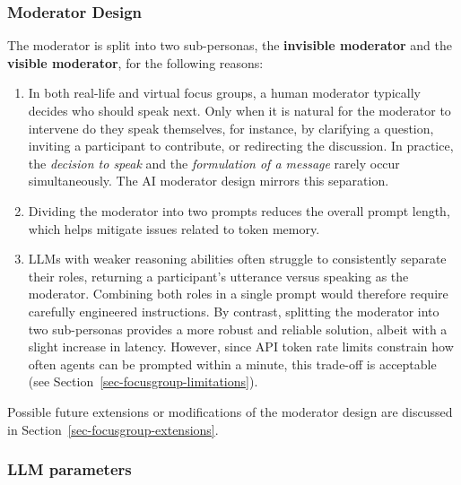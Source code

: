 \documentclass[
  letterpaper,
  DIV=11,
  numbers=noendperiod]{scrartcl}
\begin{document}
\subsubsection{Moderator
Design}\label{sec-focusgroup-design-moderatordesign}

The moderator is split into two sub-personas, the \textbf{invisible
moderator} and the \textbf{visible moderator}, for the following
reasons:

\begin{enumerate}
\def\labelenumi{\arabic{enumi}.}
\item
  In both real-life and virtual focus groups, a human moderator
  typically decides who should speak next. Only when it is natural for
  the moderator to intervene do they speak themselves, for instance, by
  clarifying a question, inviting a participant to contribute, or
  redirecting the discussion. In practice, the \emph{decision to speak}
  and the \emph{formulation of a message} rarely occur simultaneously.
  The AI moderator design mirrors this separation.
\item
  Dividing the moderator into two prompts reduces the overall prompt
  length, which helps mitigate issues related to token memory.
\item
  LLMs with weaker reasoning abilities often struggle to consistently
  separate their roles, returning a participant's utterance versus
  speaking as the moderator. Combining both roles in a single prompt
  would therefore require carefully engineered instructions. By
  contrast, splitting the moderator into two sub-personas provides a
  more robust and reliable solution, albeit with a slight increase in
  latency. However, since API token rate limits constrain how often
  agents can be prompted within a minute, this trade-off is acceptable
  (see Section~\ref{sec-focusgroup-limitations}).
\end{enumerate}

Possible future extensions or modifications of the moderator design are
discussed in Section~\ref{sec-focusgroup-extensions}.

\subsubsection{LLM
parameters}\label{sec-focusgroup-design-llmparameters}
\end{document}
